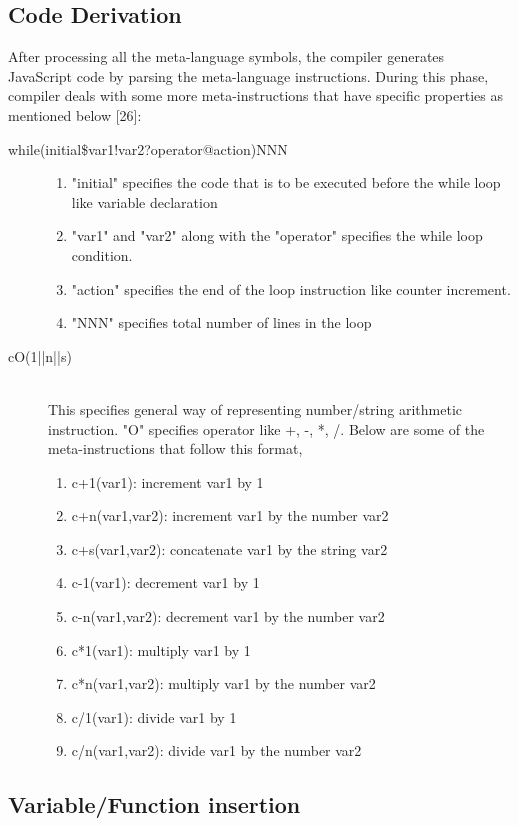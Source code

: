 \subsection{Code Derivation}
After processing all the meta-language symbols, the compiler generates JavaScript code by parsing the meta-language instructions. During this phase, compiler deals with some more meta-instructions that have specific properties as mentioned below [26]:
\begin{description}
\item[while(initial\$var1!var2?operator@action)NNN]\hfill 
\begin{enumerate}
\item "initial" specifies the code that is to be executed before the while loop like variable declaration
\item "var1" and "var2" along with the "operator" specifies the while loop condition.
\item "action" specifies the end of the loop instruction like counter increment.
\item "NNN" specifies total number of lines in the loop
\end{enumerate}

\item[cO(1||n||s)] \hfill \\
This specifies general way of representing number/string arithmetic instruction. "O" specifies operator like +, -, *, /. Below are some of the meta-instructions that follow this format,
\begin{enumerate}
\item c+1(var1): increment var1 by 1
\item c+n(var1,var2): increment var1 by the number var2
\item c+s(var1,var2): concatenate var1 by the string var2
\item c-1(var1): decrement var1 by 1
\item c-n(var1,var2): decrement var1 by the number var2
\item c*1(var1): multiply var1 by 1
\item c*n(var1,var2): multiply var1 by the number var2
\item c/1(var1): divide var1 by 1
\item c/n(var1,var2): divide var1 by the number var2 
  \end{enumerate}
\end{description}

\subsection{Variable/Function insertion}


